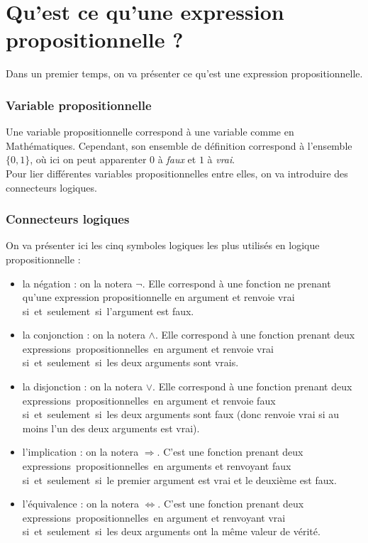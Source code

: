 \documentclass[a4paper, oneside]{report}
\newcommand{\expps}{expressions~propositionnelles~}
\newcommand{\ssi}{si~et~seulement~si~}
\begin{document}
\section*{Qu'est ce qu'une expression propositionnelle ?}

\noindent Dans un premier temps, on va présenter ce qu'est une expression propositionnelle.\\
\subsubsection*{Variable propositionnelle}
Une variable propositionnelle correspond à une variable comme en Mathématiques. Cependant, son ensemble de définition correspond à l'ensemble $\{0,1\}$, où ici on peut apparenter $0$ à \textit{faux} et $1$ à \textit{vrai}.\\
Pour lier différentes variables propositionnelles entre elles, on va introduire des connecteurs logiques.
\subsubsection*{Connecteurs logiques}
On va présenter ici les cinq symboles logiques les plus utilisés en logique propositionnelle :
\begin{itemize}
\item la négation : on la notera $\neg$. Elle correspond à une fonction ne prenant qu'une expression propositionnelle en argument et renvoie vrai \ssi l'argument est faux.

\item la conjonction : on la notera $\wedge$. Elle correspond à une fonction prenant deux \expps en argument et renvoie vrai \ssi les deux arguments sont vrais. 

\item la disjonction : on la notera $\vee$. Elle correspond à une fonction prenant deux \expps en argument et renvoie faux \ssi les deux arguments sont faux (donc renvoie vrai si au moins l'un des deux arguments est vrai).

\item l'implication : on la notera $\Rightarrow$. C'est une fonction prenant deux \expps en arguments et renvoyant faux \ssi le premier argument est vrai et le deuxième est faux.

\item l'équivalence : on la notera $\Leftrightarrow$. C'est une fonction prenant deux \expps en argument et renvoyant vrai \ssi les deux arguments ont la même valeur de vérité.

\end{itemize}
\end{document}
